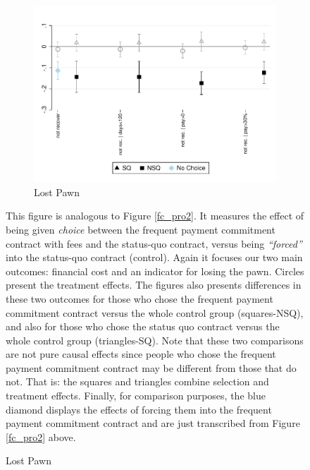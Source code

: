 \documentclass[11pt]{article}
\begin{document}
\begin{figure}[H]
\begin{center}
\begin{subfigure}{0.5\textwidth}
        \bigskip
        \bigskip
    
        \caption{Lost Pawn}
        \centering
        \includegraphics[width=\textwidth]{Figuras/def_te_pro_4.pdf}
    \end{subfigure}
    \end{center}
        \scriptsize
        This figure is analogous to Figure \ref{fc_pro2}. It measures the effect of being given \textit{choice} between the frequent payment commitment contract with fees and the status-quo contract, versus being \textit{``forced''} into the status-quo contract (control). Again it focuses our two main outcomes: financial cost and an indicator for losing the pawn. Circles present the treatment effects. The figures also presents differences in these two outcomes for those who chose the frequent payment commitment contract versus the whole control group (squares-NSQ), and also for those who chose the status quo contract versus the whole control group (triangles-SQ). Note that these two comparisons are not pure causal effects since people who chose the frequent payment commitment contract may be different from those that do not. That is: the squares and triangles combine selection and treatment effects. Finally, for comparison purposes, the blue diamond displays the effects of forcing them into the frequent payment commitment contract and are just transcribed from Figure \ref{fc_pro2} above. 
\end{figure}
\end{document}
